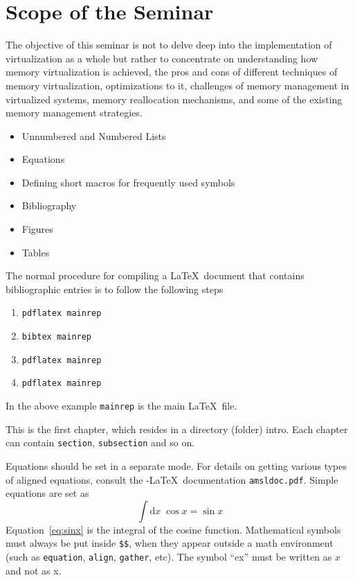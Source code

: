 \section{Scope of the Seminar}
The objective of this seminar is not to delve deep into the implementation of virtualization as a
whole but rather to concentrate on understanding how memory virtualization is achieved, the pros and cons of different techniques of memory virtualization, optimizations to it, challenges of memory management in virtualized systems, memory reallocation mechanisms, and some of the existing memory management strategies.     
\begin{itemize}
\item Unnumbered and Numbered Lists
\item Equations
\item Defining short macros for frequently used symbols
\item Bibliography
\item Figures
\item Tables
\end{itemize}

The normal procedure for compiling a \LaTeX\ document that contains
bibliographic entries is to follow the following steps
\begin{enumerate}
\item \verb|pdflatex mainrep|
\item \verb|bibtex mainrep|
\item \verb|pdflatex mainrep|
\item \verb|pdflatex mainrep|
\end{enumerate}
In the above example \verb|mainrep| is the main \LaTeX\ file.




This is the first chapter, which resides in a directory (folder)
intro. Each chapter can contain \verb|section|, \verb|subsection|
and so on.




Equations should be set in a separate mode.  For details on getting
various types of aligned equations, consult the \AmS-\LaTeX\
documentation \verb|amsldoc.pdf|. Simple equations are set as
\begin{equation}
\label{eq:sinx}
\int \mathrm{d}x \; \cos x =  \sin x
\end{equation}
Equation~\eqref{eq:sinx} is the integral of the cosine
function. Mathematical symbols must always be put inside \verb|$$|,
when they appear outside a math environment (such as \verb|equation|,
\verb|align|, \verb|gather|, etc).  The symbol ``ex'' must be written as
$x$ and not as x.  

